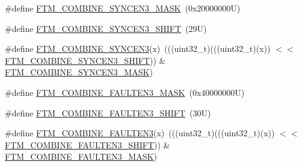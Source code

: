 \begin{DoxyCompactItemize}
\item 
\#define \mbox{\hyperlink{group___f_t_m___register___masks_ga9e631b38ed9e6cbf3a3afa812db96c21}{F\+T\+M\+\_\+\+C\+O\+M\+B\+I\+N\+E\+\_\+\+S\+Y\+N\+C\+E\+N3\+\_\+\+M\+A\+SK}}~(0x20000000\+U)
\item 
\#define \mbox{\hyperlink{group___f_t_m___register___masks_ga429ad5d8c1f8afa7450531c8c0d6421d}{F\+T\+M\+\_\+\+C\+O\+M\+B\+I\+N\+E\+\_\+\+S\+Y\+N\+C\+E\+N3\+\_\+\+S\+H\+I\+FT}}~(29\+U)
\item 
\#define \mbox{\hyperlink{group___f_t_m___register___masks_ga55f542587ffa13b9edd19f5a7890e8f7}{F\+T\+M\+\_\+\+C\+O\+M\+B\+I\+N\+E\+\_\+\+S\+Y\+N\+C\+E\+N3}}(x)~(((uint32\+\_\+t)(((uint32\+\_\+t)(x)) $<$$<$ \mbox{\hyperlink{group___f_t_m___register___masks_ga429ad5d8c1f8afa7450531c8c0d6421d}{F\+T\+M\+\_\+\+C\+O\+M\+B\+I\+N\+E\+\_\+\+S\+Y\+N\+C\+E\+N3\+\_\+\+S\+H\+I\+FT}})) \& \mbox{\hyperlink{group___f_t_m___register___masks_ga9e631b38ed9e6cbf3a3afa812db96c21}{F\+T\+M\+\_\+\+C\+O\+M\+B\+I\+N\+E\+\_\+\+S\+Y\+N\+C\+E\+N3\+\_\+\+M\+A\+SK}})
\item 
\#define \mbox{\hyperlink{group___f_t_m___register___masks_ga2f56f45afa6694ded2489432d0be896f}{F\+T\+M\+\_\+\+C\+O\+M\+B\+I\+N\+E\+\_\+\+F\+A\+U\+L\+T\+E\+N3\+\_\+\+M\+A\+SK}}~(0x40000000\+U)
\item 
\#define \mbox{\hyperlink{group___f_t_m___register___masks_ga85e6b9e11f73ef2ae12870399dbc99a6}{F\+T\+M\+\_\+\+C\+O\+M\+B\+I\+N\+E\+\_\+\+F\+A\+U\+L\+T\+E\+N3\+\_\+\+S\+H\+I\+FT}}~(30\+U)
\item 
\#define \mbox{\hyperlink{group___f_t_m___register___masks_gac2e41b393d137d701a322c1bb89549ca}{F\+T\+M\+\_\+\+C\+O\+M\+B\+I\+N\+E\+\_\+\+F\+A\+U\+L\+T\+E\+N3}}(x)~(((uint32\+\_\+t)(((uint32\+\_\+t)(x)) $<$$<$ \mbox{\hyperlink{group___f_t_m___register___masks_ga85e6b9e11f73ef2ae12870399dbc99a6}{F\+T\+M\+\_\+\+C\+O\+M\+B\+I\+N\+E\+\_\+\+F\+A\+U\+L\+T\+E\+N3\+\_\+\+S\+H\+I\+FT}})) \& \mbox{\hyperlink{group___f_t_m___register___masks_ga2f56f45afa6694ded2489432d0be896f}{F\+T\+M\+\_\+\+C\+O\+M\+B\+I\+N\+E\+\_\+\+F\+A\+U\+L\+T\+E\+N3\+\_\+\+M\+A\+SK}})
\end{DoxyCompactItemize}
